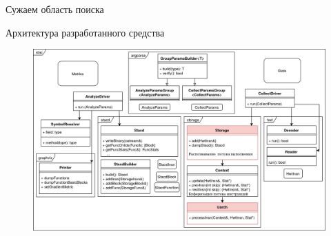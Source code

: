 \documentclass[10pt,aspectratio=169,hyperref={pdftex,unicode},xcolor=dvipsnames]{beamer}
\begin{document}
\begin{frame}[fragile]{ Сужаем область поиска }
\begin{figure}
\begin{subfigure}{0.45\textwidth}
        \end{subfigure}
        \begin{subfigure}{0.45\textwidth}
            \centering
        \end{subfigure}
    \end{figure}

\end{frame}

\begin{frame}{ Архитектура разработанного средства }
    \begin{figure}
        \centering
        \includegraphics[height=0.8\textheight,keepaspectratio]{./images/stac_classes.png}
    \end{figure}
\end{frame}
\end{document}
